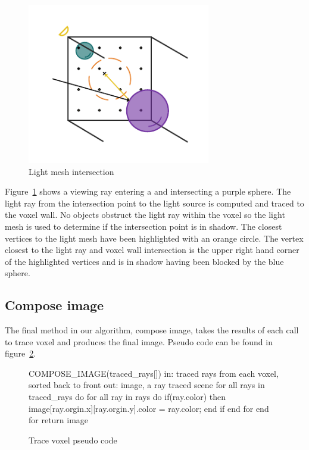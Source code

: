 \begin{figure}[t]
  \centering
  \includegraphics[width=8cm]{drawings/LightIntersection.pdf}
  \caption{Light mesh intersection}
  \label{fig:light-mesh-intersection}
\end{figure}

Figure~\ref{fig:light-mesh-intersection} shows a viewing ray entering a and
intersecting a purple sphere.  The light ray from the intersection point to the 
light source is computed and traced to the voxel wall.  No objects obstruct the
light ray within the voxel so the light mesh is used to determine if the 
intersection point is in shadow.  The closest vertices to the light mesh have 
been highlighted with an orange circle.  The vertex closest to the light ray and 
voxel wall intersection is the upper right hand corner of the highlighted 
vertices and is in shadow having been blocked by the blue sphere.

\subsection{Compose image}
The final method in our algorithm, compose image, takes the results of each
call to trace voxel and produces the final image.  Pseudo code can be found in
figure~\ref{fig:compose-image}.  

\begin{figure}[!htb]
\begin{algorithm}
COMPOSE_IMAGE(traced_rays[])
  in: traced rays from each voxel,
      sorted back to front
  out: image, a ray traced scene
  for all rays in traced_rays do
    for all ray in rays do
      if(ray.color) then
        image[ray.orgin.x][ray.orgin.y].color = ray.color;
      end if
    end for
  end for
return image
\end{algorithm}
\caption{Trace voxel pseudo code}
\label{fig:compose-image}
\end{figure}

